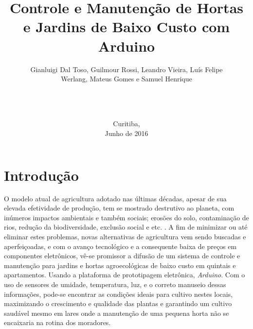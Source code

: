 \documentclass[a4paper,12pt]{article}
\begin{document}
\title{Controle e Manutenção de Hortas e Jardins de Baixo Custo com Arduino}
\author{Gianluigi Dal Toso, Guilmour Rossi, Leandro Vieira, Luís Felipe\\Werlang, Mateus Gomes e Samuel Henrique\\\texttt{}\\\\\\
}

\date{Curitiba, \\Junho de 2016}

\maketitle

\newpage


\tableofcontents


\newpage

\listoffigures

\newpage

\listoftables

\makenomenclature

\newpage
\section{Introdução}

O modelo atual de agricultura adotado nas últimas décadas, apesar de sua elevada efetividade de produção, tem se mostrado destrutivo ao planeta, com inúmeros impactos ambientais e também sociais; erosões do solo, contaminação de rios, redução da biodiversidade, exclusão social e etc. \cite[p.~23]{medeiros}. A fim de minimizar ou até eliminar estes problemas, novas alternativas de agricultura vem sendo buscadas e aperfeiçoadas, e com o avanço tecnológico e a consequente baixa de preços em componentes  eletrônicos, vê-se promissor a difusão de um sistema de controle e manutenção para jardins e hortas agroecológicas de baixo custo em quintais e apartamentos. Usando a plataforma de prototipagem eletrônica, \textit{Arduino}. Com o uso de sensores de umidade, temperatura, luz, e o correto manuseio dessas informações, pode-se encontrar as condições ideais para cultivo nestes locais, maximizando o crescimento e qualidade das plantas e garantindo um cultivo saudável mesmo em lares onde a manutenção de uma pequena horta não se encaixaria na rotina dos moradores.
\end{document}
